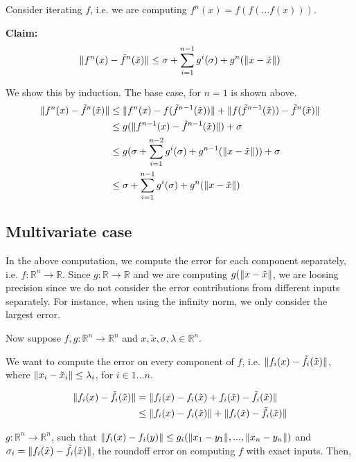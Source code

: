 Consider iterating $f$, i.e. we are computing $f^n(x) = f(f(...f(x)))$.

{\bf Claim: }
\begin{equation}
\lVert f^n(x) - \tilde{f}^n(\tilde{x})\rVert \le \sigma + \sum^{n - 1}_{i = 1} g^i(\sigma) + g^n(\lVert x - \tilde{x} \rVert)
\end{equation}

We show this by induction. The base case, for $n = 1$ is shown above.
\begin{align}
\lVert  f^n(x) - \tilde{f}^n(\tilde{x})\rVert &\le
  \lVert f^n(x) - f(\tilde{f}^{n-1}(\tilde{x})) \rVert + \lVert f(\tilde{f}^{n-1}(\tilde{x})) - \tilde{f}^n(\tilde{x})\rVert \\
  &\le g(\lVert f^{n-1}(x) - \tilde{f}^{n-1}(\tilde{x}) \rVert) + \sigma \\
  &\le g (\sigma + \sum^{n - 2}_{i = 1} g^i(\sigma) + g^{n-1}(\lVert x - \tilde{x} \rVert)) + \sigma \\
  &\le \sigma + \sum^{n - 1}_{i = 1} g^i(\sigma) + g^n(\lVert x - \tilde{x} \rVert)
\end{align}


\subsection{Multivariate case}
In the above computation, we compute the error for each component separately, i.e. $f: \mathbb{R}^n \to \mathbb{R}$.
Since $g: \mathbb{R} \to \mathbb{R}$ and we are computing $g(\lVert x - \tilde{x} \rVert$, we are loosing
precision since we do not consider the error contributions from different inputs separately.
For instance, when using the infinity norm, we only consider the largest error.

Now suppose $f, g: \mathbb{R}^n \to \mathbb{R}^n$ and $x, \tilde{x}, \sigma, \lambda \in \mathbb{R}^n$.

We want to compute the error on every component of $f$, i.e. $\lVert f_i(x) - \tilde{f}_i(\tilde{x}) \rVert$,
where $\lVert x_i - \tilde{x}_i \rVert \le \lambda_i$, for $i \in 1 \dots n$.


\begin{align}
\lVert f_i(x) - \tilde{f}_i(\tilde{x}) \rVert &=
 \lVert f_i(x) - f_i(\tilde{x}) + f_i(\tilde{x}) - \tilde{f}_i(\tilde{x}) \rVert \\
 &\le \lVert f_i(x) - f_i(\tilde{x}) \rVert + \lVert f_i(\tilde{x}) - \tilde{f}_i(\tilde{x}) \rVert
\end{align}

$g: \mathbb{R}^n \to \mathbb{R}^n$, such that
$\lVert f_i(x) - f_i(y) \rVert \le g_i(\lVert x_1 - y_1\rVert, ..., \lVert x_n - y_n\rVert)$
and $\sigma_i = \lVert f_i(\tilde{x}) - \tilde{f}_i(\tilde{x}) \rVert$, the roundoff error on
computing $f$ with exact inputs. Then,

